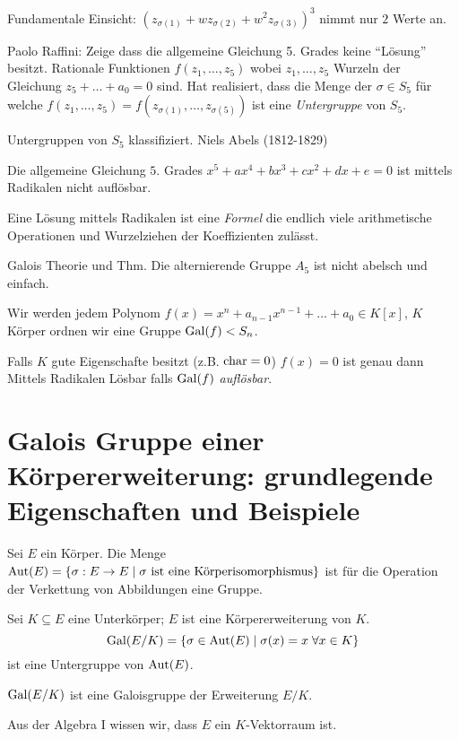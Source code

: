 Fundamentale Einsicht: $\left( z_{\sigma(1)} + w z_{\sigma(2)} + w^2 z_{\sigma(3)} \right)^3$ nimmt nur $2$ Werte an.

Paolo Raffini: Zeige dass die allgemeine Gleichung 5. Grades keine \enquote{Lösung} besitzt.
Rationale Funktionen $f(z_1,\ldots,z_{5})$ wobei $z_1,\ldots, z_5$ Wurzeln der Gleichung $z_5 + \ldots + a_0 = 0$ sind.
Hat realisiert, dass die Menge der $\sigma \in S_{5}$ für welche $f(z_1,\ldots,z_5) = f(z_{\sigma(1)},\ldots,z_{\sigma(5)})$ 
ist eine \emph{Untergruppe} von $S_{5}$.

Untergruppen von $S_{5}$ klassifiziert. Niels Abels (1812-1829)

\begin{theorem}
	Die allgemeine Gleichung $5.$ Grades $x^{5} + a x^{4}  + b x^3 + c x^2 + d x + e = 0$ ist mittels Radikalen nicht auflösbar.
\end{theorem}
Eine Lösung mittels Radikalen ist eine \emph{Formel} die endlich viele arithmetische Operationen und Wurzelziehen der Koeffizienten zulässt.

Galois Theorie und Thm. Die alternierende Gruppe $A_{5}$ ist nicht abelsch und einfach.

Wir werden jedem Polynom $f(x) = x^{n} + a_{n-1} x^{n-1} + \ldots + a_0 \in K[x]$, $K$ Körper
ordnen wir eine Gruppe $\operatorname{Gal}(f) < S_{n}$.

\begin{theorem}
	Falls $K$ gute Eigenschafte besitzt (z.B. $\operatorname{char} = 0$)
	$f(x) = 0$ ist genau dann Mittels Radikalen Lösbar falls $\operatorname{Gal}(f)$ \emph{auflösbar}.
\end{theorem}

\section{Galois Gruppe einer Körpererweiterung: grundlegende Eigenschaften und Beispiele}
Sei $E$ ein Körper. Die Menge $\operatorname{Aut}(E) = \{\sigma: E \to E \mid \sigma \text{ ist eine Körperisomorphismus}\} $ 
ist für die Operation der Verkettung von Abbildungen eine Gruppe.

Sei $K \subseteq E$ eine Unterkörper; $E$ ist eine Körpererweiterung von $K$.
\[
	\gal(E / K) = \{\sigma \in \aut(E) \mid \sigma(x) = x \forall x \in K\} 
\]
ist eine Untergruppe von $\operatorname{Aut}(E)$.
\begin{definition}
	$\operatorname{Gal}(E / K)$ ist eine Galoisgruppe der Erweiterung $E / K$.
\end{definition}
Aus der Algebra I wissen wir, dass $E$ ein $K$-Vektorraum ist.

